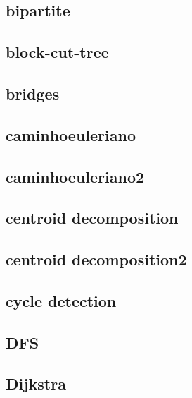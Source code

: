 \subsection{bipartite}
\raggedbottom
\hrulefill
\subsection{block-cut-tree}
\raggedbottom
\hrulefill
\subsection{bridges}
\raggedbottom
\hrulefill
\subsection{caminhoeuleriano}
\raggedbottom
\hrulefill
\subsection{caminhoeuleriano2}
\raggedbottom
\hrulefill
\subsection{centroid decomposition}
\raggedbottom
\hrulefill
\subsection{centroid decomposition2}
\raggedbottom
\hrulefill
\subsection{cycle detection}
\raggedbottom
\hrulefill
\subsection{DFS}
\raggedbottom
\hrulefill
\subsection{Dijkstra}
\raggedbottom
\hrulefill
